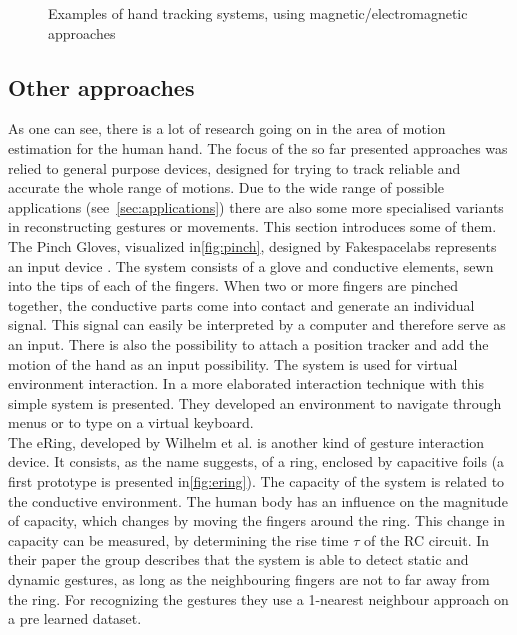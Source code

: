 \begin{figure}[h]
	
	\caption{Examples of hand tracking systems, using magnetic/electromagnetic approaches}
	\label{fig:examplesMagnetic}
\end{figure}


\subsection{Other approaches} \label{subsec:approaches:other}
As one can see, there is a lot of research going on in the area of motion estimation for the human hand. The focus of the so far presented approaches was relied to general purpose devices, designed for trying to track reliable and accurate the whole range of motions. Due to the wide range of possible applications (see~\ref{sec:applications}) there are also some more specialised variants in reconstructing gestures or movements. This section introduces some of them.\\
The Pinch Gloves, visualized in\ref{fig:pinch}, designed by Fakespacelabs represents an input device \cite{bowman2001using}. The system consists of a glove and conductive elements, sewn into the tips of each of the fingers. When two or more fingers are pinched together, the conductive parts come into contact and generate an individual signal. This signal can easily be interpreted by a computer and therefore serve as an input. There is also the possibility to attach a position tracker and add the motion of the hand as an input possibility. The system is used for virtual environment interaction. In \cite{bowman2001using} a more elaborated interaction technique with this simple system is presented. They developed an environment to navigate through menus or to type on a virtual keyboard.\\
The eRing, developed by Wilhelm et al. is another kind of gesture interaction device. It consists, as the name suggests, of a ring, enclosed by capacitive foils (a first prototype is presented in\ref{fig:ering}). The capacity of the system is related to the conductive environment. The human body has an influence on the magnitude of capacity, which changes by moving the fingers around the ring. This change in capacity can be measured, by determining the rise time $ \tau $ of the RC circuit. In their paper the group describes that the system is able to detect static and dynamic gestures, as long as the neighbouring fingers are not to far away from the ring. For recognizing the gestures they use a 1-nearest neighbour approach on a pre learned dataset.\\
